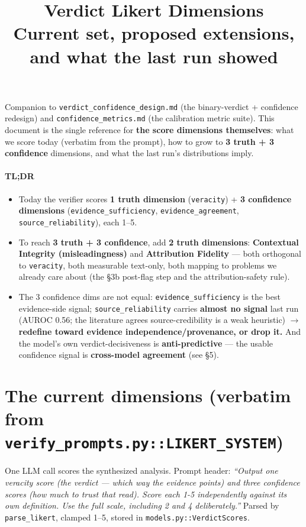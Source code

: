 \documentclass[11pt]{article}
\title{Verdict Likert Dimensions\\[0.3em]
\large Current set, proposed extensions, and what the last run showed}
\author{}
\date{}
\begin{document}
\maketitle

Companion to \texttt{verdict\_confidence\_design.md} (the binary-verdict + confidence
redesign) and \texttt{confidence\_metrics.md} (the calibration metric suite). This document
is the single reference for \textbf{the score dimensions themselves}: what we score today
(verbatim from the prompt), how to grow to \textbf{3 truth + 3 confidence} dimensions, and
what the last run's distributions imply.

\paragraph{TL;DR}
\begin{itemize}[leftmargin=1.4em]
  \item Today the verifier scores \textbf{1 truth dimension} (\texttt{veracity}) +
    \textbf{3 confidence dimensions} (\texttt{evidence\_sufficiency},
    \texttt{evidence\_agreement}, \texttt{source\_reliability}), each 1--5.
  \item To reach \textbf{3 truth + 3 confidence}, add \textbf{2 truth dimensions}:
    \textbf{Contextual Integrity (misleadingness)} and \textbf{Attribution Fidelity} ---
    both orthogonal to \texttt{veracity}, both measurable text-only, both mapping to
    problems we already care about (the \S3b post-flag step and the attribution-safety rule).
  \item The 3 confidence dims are not equal: \texttt{evidence\_sufficiency} is the best
    evidence-side signal; \texttt{source\_reliability} carries \textbf{almost no signal}
    last run (AUROC 0.56; the literature agrees source-credibility is a weak heuristic)
    $\rightarrow$ \textbf{redefine toward evidence independence/provenance, or drop it.}
    And the model's own verdict-decisiveness is \textbf{anti-predictive} --- the usable
    confidence signal is \textbf{cross-model agreement} (see \S5).
\end{itemize}

\hrulefill

\section{The current dimensions (verbatim from \texttt{verify\_prompts.py::LIKERT\_SYSTEM})}

One LLM call scores the synthesized analysis. Prompt header: \emph{``Output one veracity
score (the verdict --- which way the evidence points) and three confidence scores (how much
to trust that read). Score each 1-5 independently against its own definition. Use the full
scale, including 2 and 4 deliberately.''} Parsed by \texttt{parse\_likert}, clamped 1--5,
stored in \texttt{models.py::VerdictScores}.
\end{document}
